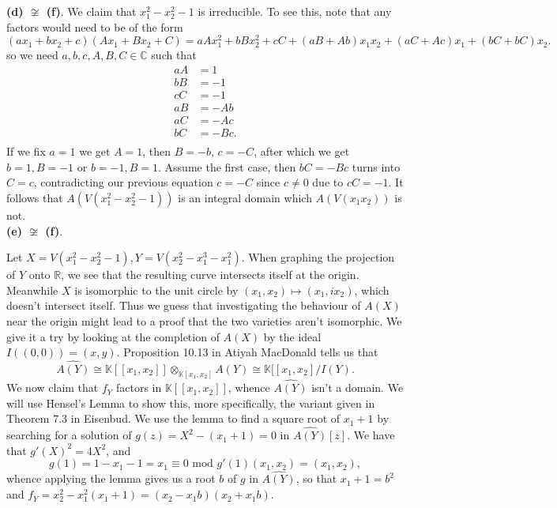 \documentclass{article}
\theoremstyle{definition}
\newcommand{\R}{\mathbb{R}}
\newcommand{\C}{\mathbb{C}}
\newcommand{\K}{\mathbb{K}}
\begin{document}
\textbf{(d) $\not \cong$ (f)}. 
We claim that $x_1^{2} - x_2^{2} - 1$ is irreducible. To see this,
note that any factors would need to be of the form
\[
	(ax_1 + bx_2 + c)
	(Ax_1 + Bx_2 + C)
	=
	aAx_1^{2} + bBx_2^{2} + cC
	+
	(aB + Ab)x_1x_2 + (aC + Ac)x_1 + (bC + bC) x_2.
\] 
so we need $a, b, c, A, B, C \in \C$ such that 
\begin{align*}
	aA &= 1 \\
	bB &= -1 \\
	cC &= -1 \\
	aB &= -Ab \\
	aC &= -Ac \\
	bC &= -Bc. \\
\end{align*}
If we fix $a = 1$ we get $A = 1$, then $B = -b$, $c = -C$, after which we get
$b = 1, B = -1$ or $b = -1, B = 1$. Assume the first case, then $bC = -Bc$
turns into $C = c$, contradicting our previous equation $c = -C$ since $c \not
= 0$ due to $cC = -1$. It follows that $A(V(x_1^{2} - x_2^{2} - 1))$ is an
integral domain which $A(V(x_1x_2))$ is not. \\


\textbf{(e) $\not \cong$ (f)}. 


Let $X = V(x_1^{2} - x_2^{2} - 1), Y = V(x_2^{2} - x_1^{3} - x_1^{2})$. When
graphing the projection of $Y$ onto $\R$, we see that the resulting curve
intersects itself at the origin. Meanwhile $X$ is isomorphic to the unit circle
by $(x_1, x_2) \mapsto (x_1, ix_2)$, which doesn't intersect itself. Thus we
guess that investigating the behaviour of $A(X)$ near the origin might lead to
a proof that the two varieties aren't isomorphic. We give it a try by looking
at the completion of $A(X)$ by the ideal $I((0, 0)) = (x, y)$. Proposition
10.13 in Atiyah MacDonald tells us that 
\[
	\widehat{A(Y)} 
	\cong 
	\K[[x_1, x_2]] \otimes_{\K[x_1,x_2]} A(Y)
	\cong 
	\K[[x_1,x_2]/I(Y).
\] 
We now claim that $f_Y$ factors in $\K[[x_1, x_2]]$, whence $\widehat{A(Y)}$
isn't a domain. We will use Hensel's Lemma to show this, more specifically, the
variant given in Theorem 7.3 in Eisenbud. We use the lemma to find a square root
of $x_1 + 1$ by searching for a solution of $g(z) = X^{2} - (x_1 + 1) = 0$
in $\widehat{A(Y)}[z]$. We have that $g'(X)^{2} = 4X^{2}$, and 
\[
	g(1) = 1 - x_1 - 1 = x_1 \equiv 0 \text{ mod } g'(1)(x_1, x_2) = (x_1, x_2),
\] 
whence applying the lemma gives us a root $b$ of $g$ in $\widehat{A(Y)}$, so
that $x_1 + 1 = b^{2}$ and $f_Y = x_2^{2} - x_1^{2}(x_1 + 1) = (x_2 - x_1b)
(x_2 + x_1b)$. \\
\end{document}
